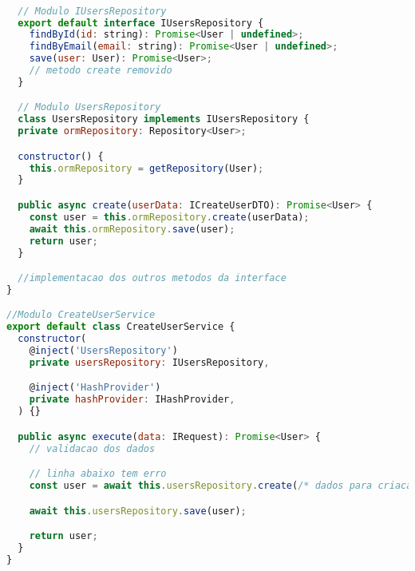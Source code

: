 \begin{lstlisting}[language=JavaScript, caption={Violando o LSP},captionpos=b, label=alg:lspviolation]

  // Modulo IUsersRepository
  export default interface IUsersRepository {
    findById(id: string): Promise<User | undefined>;
    findByEmail(email: string): Promise<User | undefined>;
    save(user: User): Promise<User>;
    // metodo create removido
  }

  // Modulo UsersRepository
  class UsersRepository implements IUsersRepository {
  private ormRepository: Repository<User>;

  constructor() {
    this.ormRepository = getRepository(User);
  }

  public async create(userData: ICreateUserDTO): Promise<User> {
    const user = this.ormRepository.create(userData);
    await this.ormRepository.save(user);
    return user;
  }

  //implementacao dos outros metodos da interface
}

//Modulo CreateUserService
export default class CreateUserService {
  constructor(
    @inject('UsersRepository')
    private usersRepository: IUsersRepository,

    @inject('HashProvider')
    private hashProvider: IHashProvider,
  ) {}

  public async execute(data: IRequest): Promise<User> {
    // validacao dos dados

    // linha abaixo tem erro
    const user = await this.usersRepository.create(/* dados para criacao do usuario */);

    await this.usersRepository.save(user);

    return user;
  }
}

  \end{lstlisting}